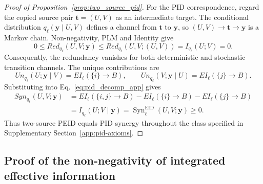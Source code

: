 \documentclass[fleqn,10pt]{wlscirep}
\begin{document}
{\begin{proof}[Proof of Proposition~\ref{prop:two_source_pid}]
For the PID correspondence, regard the copied source pair $\boldsymbol{t}=(U,V)$ as an intermediate target. The conditional distribution $q_\ell(\boldsymbol{y}\mid U,V)$ defines a channel from $\boldsymbol{t}$ to $\boldsymbol{y}$, so $(U,V)\rightarrow\boldsymbol{t}\rightarrow\boldsymbol{y}$ is a Markov chain. Non-negativity, PLM and Identity give
\begin{equation}
0\leq Red_{q_\ell}(U,V;\boldsymbol{y})
\leq Red_{q_\ell}(U,V;(U,V))
=I_{q_\ell}(U;V)=0.
\label{eq:supp_redundancy_zero}
\end{equation}
Consequently, the redundancy vanishes for both deterministic and stochastic transition channels. The unique contributions are
\begin{equation}
Un_{q_\ell}(U;\boldsymbol{y}\mid V)=EI_\ell(\{i\}\rightarrow B),
\qquad
Un_{q_\ell}(V;\boldsymbol{y}\mid U)=EI_\ell(\{j\}\rightarrow B).
\label{eq:supp_unique_information}
\end{equation}
Substituting into Eq.~\eqref{eq:pid_decomp_app} gives
\begin{align}
Syn_{q_\ell}(U,V;\boldsymbol{y})
&=EI_\ell(\{i,j\}\rightarrow B)-EI_\ell(\{i\}\rightarrow B)-EI_\ell(\{j\}\rightarrow B)\nonumber\\
&=I_{q_\ell}(U;V\mid\boldsymbol{y})
=\operatorname{Syn}^{\mathrm{EID}}_\ell(U,V;\boldsymbol{y})\geq0.
\label{eq:supp_two_source_synergy}
\end{align}
Thus two-source PEID equals PID synergy throughout the class specified in Supplementary Section~\ref{app:pid-axioms}.
\end{proof}
}

\subsection{Proof of the non-negativity of integrated effective information}
\label{app:proof_integrated_ei_nonnegativity}
\end{document}
